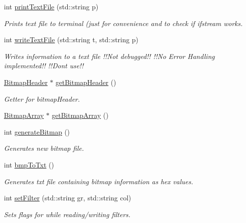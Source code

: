 \begin{DoxyCompactItemize}
int \mbox{\hyperlink{classImage_ae5daf791502caefeae1b15360d354513}{print\+Text\+File}} (std\+::string p)
\begin{DoxyCompactList}\small\item\em Prints text file to terminal (just for convenience and to check if ifstream works. \end{DoxyCompactList}\item 
int \mbox{\hyperlink{classImage_a2dc30c9d6280b8c0edd2f4f0ab474a5c}{write\+Text\+File}} (std\+::string t, std\+::string p)
\begin{DoxyCompactList}\small\item\em Writes information to a text file !!\+Not debugged!! !!\+No Error Handling implemented!! !!\+Dont use!! \end{DoxyCompactList}\item 
\mbox{\hyperlink{classBitmapHeader}{Bitmap\+Header}} $\ast$ \mbox{\hyperlink{classImage_a8c824ffac0c866a94752a2c1047932af}{get\+Bitmap\+Header}} ()
\begin{DoxyCompactList}\small\item\em Getter for bitmap\+Header. \end{DoxyCompactList}\item 
\mbox{\hyperlink{classBitmapArray}{Bitmap\+Array}} $\ast$ \mbox{\hyperlink{classImage_a75b5051c6cc39a5e3f86d287f5cc7f9c}{get\+Bitmap\+Array}} ()
\item 
int \mbox{\hyperlink{classImage_a3ca1ae6c1eb2846bfba066b01e6020e1}{generate\+Bitmap}} ()
\begin{DoxyCompactList}\small\item\em Generates new bitmap file. \end{DoxyCompactList}\item 
int \mbox{\hyperlink{classImage_aa16c9acd068079c676dec4186262b1b7}{bmp\+To\+Txt}} ()
\begin{DoxyCompactList}\small\item\em Generates txt file containing bitmap information as hex values. \end{DoxyCompactList}\item 
int \mbox{\hyperlink{classImage_ac81078a3d6c364aada9afc3c8a668ef8}{set\+Filter}} (std\+::string gr, std\+::string col)
\begin{DoxyCompactList}\small\item\em Sets flags for while reading/writing filters. \end{DoxyCompactList}\end{DoxyCompactItemize}

